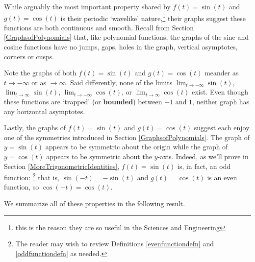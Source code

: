 \documentclass{ximera}
\begin{document}
While arguably the most important property shared by  $f(t) = \sin(t)$ and $g(t) = \cos(t)$ is their periodic `wavelike' nature,\footnote{this is the reason they are so useful in the Sciences and Engineering} their graphs suggest these functions are both continuous and smooth.  Recall from Section \ref{GraphsofPolynomials} that, like polynomial functions, the graphs of the sine and cosine functions have no jumps, gaps, holes in the graph,  vertical asymptotes, corners or cusps.  



Note the graphs of both $f(t) = \sin(t)$ and $g(t) = \cos(t)$ meander  as $t \rightarrow -\infty$ or as $ \rightarrow \infty$.  Said differently, none of the limits  $\lim_{t \rightarrow -\infty} \sin(t)$,   $\lim_{t \rightarrow \infty} \sin(t)$, $\lim_{t \rightarrow -\infty} \cos(t)$, or $\lim_{t \rightarrow \infty} \cos(t)$ exist.  Even though these functions are `trapped' (or \textbf{bounded}) between $-1$ and $1$, neither graph has any horizontal asymptotes.



Lastly, the graphs of  $f(t) = \sin(t)$ and $g(t) = \cos(t)$ suggest each enjoy one of the symmetries introduced in Section \ref{GraphsofPolynomials}.  The graph of $y = \sin(t)$ appears to be symmetric about the origin while the graph of $y = \cos(t)$ appears to be symmetric about the $y$-axis.  Indeed, as we'll prove in Section \ref{MoreTrigonometricIdentities}, $f(t) = \sin(t)$ is, in fact, an odd function: \footnote{The reader may wish to review Definitions  \ref{evenfunctiondefn} and  \ref{oddfunctiondefn} as needed.}  that is, $\sin(-t) = -\sin(t)$ and  $g(t) = \cos(t)$ is an even function, so $\cos(-t) = \cos(t)$.  



 We summarize all of these properties in the following result.



\end{document}
